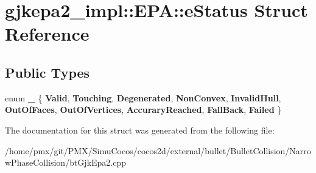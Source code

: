 \hypertarget{structgjkepa2__impl_1_1EPA_1_1eStatus}{}\section{gjkepa2\+\_\+impl\+:\+:E\+PA\+:\+:e\+Status Struct Reference}
\label{structgjkepa2__impl_1_1EPA_1_1eStatus}
\subsection*{Public Types}
\begin{DoxyCompactItemize}
\item 
\mbox{\label{structgjkepa2__impl_1_1EPA_1_1eStatus_a0bc55f16c679e32afbba1952f6a627be}} 
enum {\bfseries \+\_\+} \{ \newline
{\bfseries Valid}, 
{\bfseries Touching}, 
{\bfseries Degenerated}, 
{\bfseries Non\+Convex}, 
\newline
{\bfseries Invalid\+Hull}, 
{\bfseries Out\+Of\+Faces}, 
{\bfseries Out\+Of\+Vertices}, 
{\bfseries Accurary\+Reached}, 
\newline
{\bfseries Fall\+Back}, 
{\bfseries Failed}
 \}
\end{DoxyCompactItemize}


The documentation for this struct was generated from the following file\+:\begin{DoxyCompactItemize}
\item 
/home/pmx/git/\+P\+M\+X/\+Simu\+Cocos/cocos2d/external/bullet/\+Bullet\+Collision/\+Narrow\+Phase\+Collision/bt\+Gjk\+Epa2.\+cpp\end{DoxyCompactItemize}
